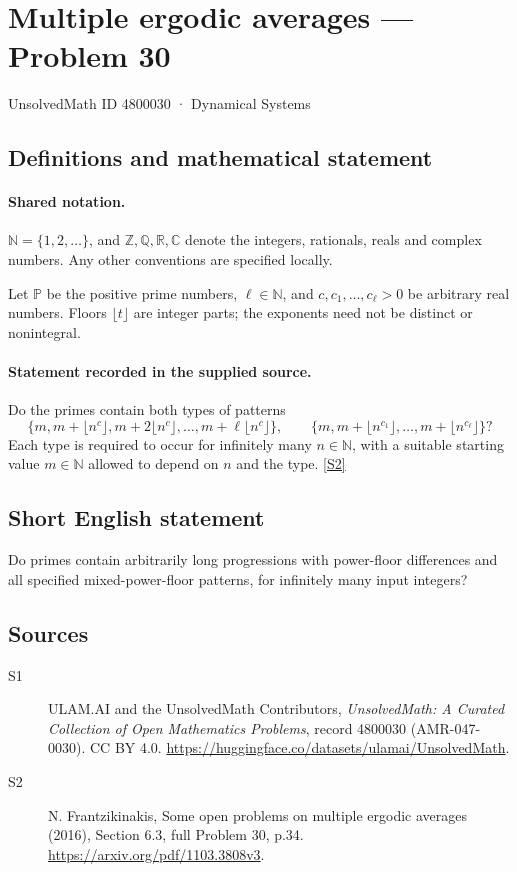 \documentclass[11pt]{article}
\newcommand{\sref}[2]{\hyperlink{source:#1:#2}{[S#2]}}
\begin{document}
\setcounter{section}{4800029}
\section{Multiple ergodic averages — Problem 30}\label{4800030}
{\small\sffamily UnsolvedMath ID 4800030 · Dynamical Systems}
\subsection{Definitions and mathematical statement}

\paragraph{Shared notation.}$\mathbb N=\{1,2,\ldots\}$, and $\mathbb Z,\mathbb Q,\mathbb R,\mathbb C$ denote the integers, rationals, reals and complex numbers. Any other conventions are specified locally.


Let $\mathbb P$ be the positive prime numbers, $\ell\in\mathbb N$, and $c,c_1,\ldots,c_\ell>0$ be arbitrary real numbers. Floors $\lfloor t\rfloor$ are integer parts; the exponents need not be distinct or nonintegral.
\paragraph{Statement recorded in the supplied source.}
Do the primes contain both types of patterns \[\{m,m+\lfloor n^c\rfloor,m+2\lfloor n^c\rfloor,\ldots,m+\ell\lfloor n^c\rfloor\},\qquad \{m,m+\lfloor n^{c_1}\rfloor,\ldots,m+\lfloor n^{c_\ell}\rfloor\}?\] Each type is required to occur for infinitely many $n\in\mathbb N$, with a suitable starting value $m\in\mathbb N$ allowed to depend on $n$ and the type. \sref{4800030}{2}
\subsection{Short English statement}
Do primes contain arbitrarily long progressions with power-floor differences and all specified mixed-power-floor patterns, for infinitely many input integers?
\subsection{Sources}
\begin{description}
\item[\hypertarget{source:4800030:1}{S1}] ULAM.AI and the UnsolvedMath Contributors, \emph{UnsolvedMath: A Curated Collection of Open Mathematics Problems}, record 4800030 (AMR-047-0030). CC BY 4.0. \url{https://huggingface.co/datasets/ulamai/UnsolvedMath}.
\item[\hypertarget{source:4800030:2}{S2}] N. Frantzikinakis, Some open problems on multiple ergodic averages (2016), Section 6.3, full Problem 30, p.34. \url{https://arxiv.org/pdf/1103.3808v3}.
\end{description}
\label{end:4800030}
\end{document}
